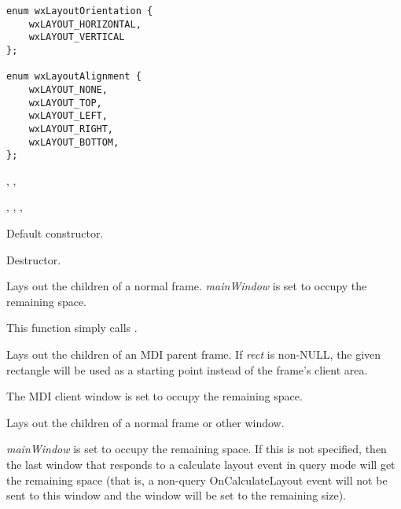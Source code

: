 
{\small
\begin{verbatim}
enum wxLayoutOrientation {
    wxLAYOUT_HORIZONTAL,
    wxLAYOUT_VERTICAL
};

enum wxLayoutAlignment {
    wxLAYOUT_NONE,
    wxLAYOUT_TOP,
    wxLAYOUT_LEFT,
    wxLAYOUT_RIGHT,
    wxLAYOUT_BOTTOM,
};
\end{verbatim}
}


, , 

,\rtfsp
{},\rtfsp
{},\rtfsp
{}




Default constructor.



Destructor.

\label{wxlayoutalgorithmlayoutframe}


Lays out the children of a normal frame. {\it mainWindow} is set to occupy the remaining space.

This function simply calls .

\label{wxlayoutalgorithmlayoutmdiframe}


Lays out the children of an MDI parent frame. If {\it rect} is non-NULL, the
given rectangle will be used as a starting point instead of the frame's client area.

The MDI client window is set to occupy the remaining space.

\label{wxlayoutalgorithmlayoutwindow}


Lays out the children of a normal frame or other window.

{\it mainWindow} is set to occupy the remaining space. If this is not specified, then
the last window that responds to a calculate layout event in query mode will get the remaining space
(that is, a non-query OnCalculateLayout event will not be sent to this window and the window will be set
to the remaining size).

